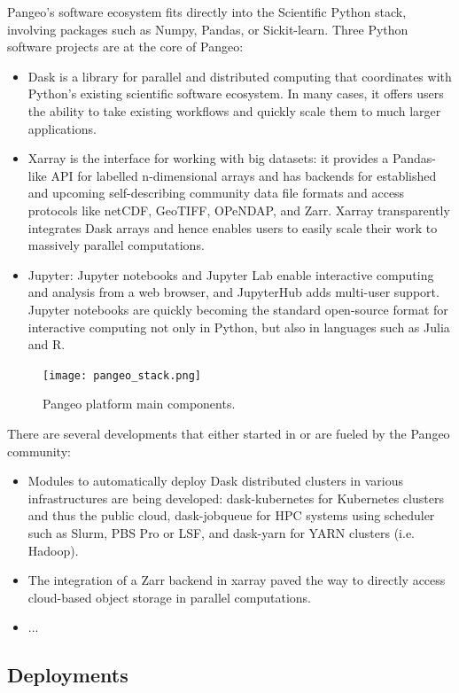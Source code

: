 \documentclass{article}
\begin{document}
Pangeo's software ecosystem fits directly into the Scientific Python stack, involving packages such as Numpy, Pandas, or Sickit-learn.  Three Python software projects are at the core of Pangeo:
\begin{itemize}
\item Dask is a library for parallel and distributed computing that coordinates with Python’s existing scientific software ecosystem.  In many cases, it offers users the ability to take existing workflows and quickly scale them to much larger applications.
\item Xarray is the interface for working with big datasets: it provides a Pandas-like API for labelled n-dimensional arrays and has backends for established and upcoming self-describing community data file formats and access protocols like netCDF, GeoTIFF, OPeNDAP, and Zarr.  Xarray transparently integrates Dask arrays and hence enables users to easily scale their work to massively parallel computations.
\item Jupyter: Jupyter notebooks and Jupyter Lab enable interactive computing and analysis from a web browser, and JupyterHub adds multi-user support.  Jupyter notebooks are quickly becoming the standard open-source format for interactive computing not only in Python, but also in languages such as Julia and R.
\end{itemize}

\begin{figure}
  \centering
  \texttt{[image: pangeo\_stack.png]}
  \caption{\label{pangeo_stack} Pangeo platform main components.}
\end{figure}

There are several developments that either started in or are fueled by the
Pangeo community:
\begin{itemize}
\item Modules to automatically deploy Dask distributed clusters in various infrastructures are being developed: dask-kubernetes for Kubernetes clusters and thus the public cloud, dask-jobqueue\cite{b4} for HPC systems using scheduler such as Slurm, PBS Pro or LSF, and dask-yarn for YARN clusters (i.e. Hadoop).
\item The integration of a Zarr backend in xarray paved the way to directly access cloud-based object storage in parallel computations.
\item ...
\end{itemize}

\subsection{Deployments}
\label{ssec:deployments}
\end{document}
